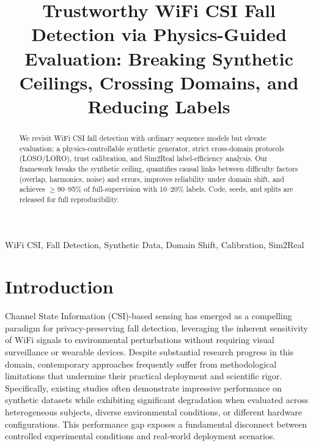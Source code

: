 \documentclass[10pt,conference]{IEEEtran}
\begin{document}
\title{Trustworthy WiFi CSI Fall Detection via Physics-Guided Evaluation: Breaking Synthetic Ceilings, Crossing Domains, and Reducing Labels}

\author{
}

\maketitle

\begin{abstract}
We revisit WiFi CSI fall detection with ordinary sequence models but elevate evaluation: a physics-controllable synthetic generator, strict cross-domain protocols (LOSO/LORO), trust calibration, and Sim2Real label-efficiency analysis. Our framework breaks the synthetic ceiling, quantifies causal links between difficulty factors (overlap, harmonics, noise) and errors, improves reliability under domain shift, and achieves $\geq$90--95\% of full-supervision with 10--20\% labels. Code, seeds, and splits are released for full reproducibility.
\end{abstract}

\begin{IEEEkeywords}
WiFi CSI, Fall Detection, Synthetic Data, Domain Shift, Calibration, Sim2Real
\end{IEEEkeywords}

\section{Introduction}

Channel State Information (CSI)-based sensing has emerged as a compelling paradigm for privacy-preserving fall detection, leveraging the inherent sensitivity of WiFi signals to environmental perturbations without requiring visual surveillance or wearable devices. Despite substantial research progress in this domain, contemporary approaches frequently suffer from methodological limitations that undermine their practical deployment and scientific rigor. Specifically, existing studies often demonstrate impressive performance on synthetic datasets while exhibiting significant degradation when evaluated across heterogeneous subjects, diverse environmental conditions, or different hardware configurations. This performance gap exposes a fundamental disconnect between controlled experimental conditions and real-world deployment scenarios.
\end{document}
